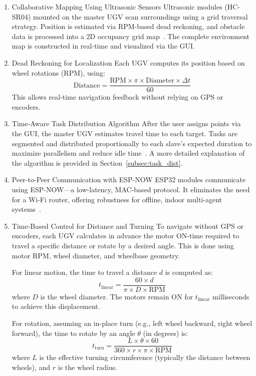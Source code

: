 \documentclass[conference]{IEEEtran}
\begin{document}
\begin{enumerate}
\item {Collaborative Mapping Using Ultrasonic Sensors}
Ultrasonic modules (HC-SR04) mounted on the master UGV scan surroundings using a grid traversal strategy. Position is estimated via RPM-based dead reckoning, and obstacle data is processed into a 2D occupancy grid map~\cite{arduino_hcsr04}. The complete environment map is constructed in real-time and visualized via the GUI.

\item {Dead Reckoning for Localization}
Each UGV computes its position based on wheel rotations (RPM), using:
\begin{equation}
\text{Distance} = \frac{\text{RPM} \times \pi \times \text{Diameter} \times \Delta t}{60}
\end{equation}
This allows real-time navigation feedback without relying on GPS or encoders.

\item {Time-Aware Task Distribution Algorithm}
After the user assigns points via the GUI, the master UGV estimates travel time to each target. Tasks are segmented and distributed proportionally to each slave’s expected duration to maximize parallelism and reduce idle time~\cite{jin2024multi}. A more detailed explanation of the algorithm is provided in Section~\ref{subsec:task_dist}.

\item {Peer-to-Peer Communication with ESP-NOW}
ESP32 modules communicate using ESP-NOW—a low-latency, MAC-based protocol. It eliminates the need for a Wi-Fi router, offering robustness for offline, indoor multi-agent systems~\cite{espnowguide}.


\item {Time-Based Control for Distance and Turning}
To navigate without GPS or encoders, each UGV calculates in advance the motor ON-time required to travel a specific distance or rotate by a desired angle. This is done using motor RPM, wheel diameter, and wheelbase geometry.

For linear motion, the time to travel a distance $d$ is computed as:
\begin{equation}
t_{\text{linear}} = \frac{60 \times d}{\pi \times D \times \text{RPM}}
\end{equation}
where $D$ is the wheel diameter. The motors remain ON for $t_{\text{linear}}$ milliseconds to achieve this displacement.

For rotation, assuming an in-place turn (e.g., left wheel backward, right wheel forward), the time to rotate by an angle $\theta$ (in degrees) is:
\begin{equation}
t_{\text{turn}} = \frac{L \times \theta \times 60}{360 \times r \times \pi \times \text{RPM}}
\end{equation}
where $L$ is the effective turning circumference (typically the distance between wheels), and $r$ is the wheel radius.


\end{enumerate}
\end{document}
